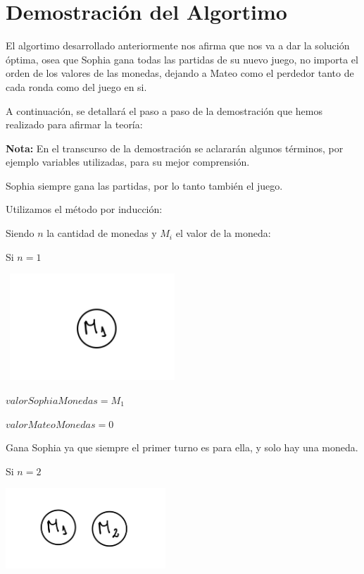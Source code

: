 \section{Demostración del Algortimo} 
\label{ch:demostracion}

El algortimo desarrollado anteriormente nos afirma que nos va a dar la solución óptima,
osea que Sophia gana todas las partidas de su nuevo juego, no importa el orden de los valores
de las monedas, dejando a Mateo como el perdedor tanto de cada ronda como del juego en si.

\vskip0.5cm

A continuación, se detallará el paso a paso de la demostración que hemos realizado para afirmar la teoría:


\textbf{Nota:} En el transcurso de la demostración se aclararán algunos términos, por ejemplo variables utilizadas, para su mejor comprensión.
\vskip0.5cm

Sophia siempre gana las partidas, por lo tanto también el juego.

\vskip0.5cm
Utilizamos el método por inducción:
\vskip0.5cm

Siendo $n$ la cantidad de monedas y $M_{i}$ el valor de la moneda:

\vskip0.5cm

Si $n=1$ 

\includegraphics[width=6.5cm, height=4cm]{images/IMG_1625.jpg}


$valorSophiaMonedas=M_{1}$

$valorMateoMonedas=0$

Gana Sophia ya que siempre el primer turno es para ella, y solo hay una moneda.

\vskip1cm

Si $n=2$

\includegraphics[width=6cm, height=3cm]{images/IMG_1626.jpg}

